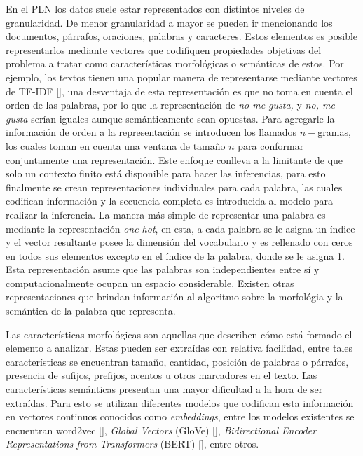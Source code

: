En el PLN los datos suele estar representados con distintos niveles de granularidad.
De menor granularidad a mayor se pueden ir mencionando los documentos, párrafos, oraciones, palabras y
caracteres. Estos elementos es posible representarlos mediante vectores que codifiquen propiedades
objetivas del problema a tratar como características morfológicas o semánticas de estos. Por ejemplo, 
los textos tienen una popular manera de representarse mediante vectores de TF-IDF [\cite{manning2008introduction}],
una desventaja de esta representación es que no toma en cuenta el orden de las palabras, por lo que 
la representación de \emph{no me gusta,} y \emph{no, me gusta} serían iguales aunque semánticamente 
sean opuestas. Para agregarle la información de orden a la representación se introducen los llamados 
$n-$gramas, los cuales toman en cuenta una ventana de tamaño $n$ para conformar conjuntamente una representación.
Este enfoque conlleva a la limitante de que solo un contexto finito está disponible para hacer las inferencias,
para esto finalmente se crean representaciones individuales para cada palabra, las cuales codifican 
información y la secuencia completa es introducida al modelo para realizar la inferencia.
La manera más simple de representar una palabra es mediante la representación \emph{one-hot}, 
en esta, a cada palabra se le asigna un índice y el vector resultante posee la dimensión del 
vocabulario y es rellenado con ceros en todos sus elementos excepto en el índice de la palabra, donde se le asigna 1.
Esta representación asume que las palabras son independientes entre sí y 
computacionalmente ocupan un espacio considerable. Existen otras representaciones 
que brindan información al algoritmo sobre la morfológia y la semántica de la palabra que representa.

Las características morfológicas son aquellas que describen cómo está formado el elemento a analizar.
Estas pueden ser extraídas con relativa facilidad, entre tales características se encuentran tamaño, 
cantidad, posición de palabras o párrafos, presencia de sufijos, prefijos, acentos u otros marcadores
en el texto. Las características semánticas presentan una mayor dificultad a la hora de ser extraídas.
Para esto se utilizan diferentes modelos que codifican esta información en vectores continuos conocidos como 
\emph{embeddings}, entre los modelos existentes se encuentran
word2vec [\cite{mikolov2013efficient}], 
\emph{Global Vectors} (GloVe) [\cite{pennington2014glove}], 
\emph{Bidirectional Encoder Representations from Transformers} (BERT) [\cite{devlin2018bert}],
entre otros.

